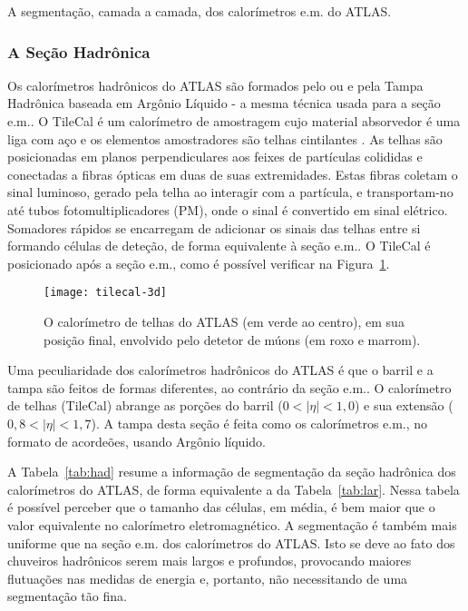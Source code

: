 \begin{table}
\caption{A segmentação, camada a camada, dos calo\-rí\-metros e.m. do ATLAS.}
\label{tab:lar}
\begin{center}

\end{center}
\end{table}

\subsubsection{A Seção Hadrônica}

Os calorímetros hadrônicos do ATLAS são formados pelo  ou  e pela Tampa Hadrônica baseada em Argônio Líquido
- a mesma técnica usada para a seção e.m.. O TileCal é um calorímetro de
amostragem cujo material absorvedor é uma liga com aço e os elementos
amostradores são telhas cintilantes \cite{tilecal}. As telhas são posicionadas
em planos perpendiculares aos feixes de partículas colididas e conectadas a
fibras ópticas em duas de suas extremidades. Estas fibras coletam o sinal
luminoso, gerado pela telha ao interagir com a partícula, e transportam-no até
tubos fotomultiplicadores (PM), onde o sinal
é convertido em sinal elétrico. Somadores rápidos \cite{seixas:adder} se
encarregam de adicionar os sinais das telhas entre si formando células de
deteção, de forma equivalente à seção e.m.. O TileCal é posicionado após a
seção e.m., como é possível verificar na Figura~\ref{fig:tile-pos}.

\begin{figure}
\begin{center}
\texttt{[image: tilecal-3d]}
\end{center}
\caption{O calorímetro de telhas do ATLAS (em verde ao centro), em sua posição
final, envolvido pelo detetor de múons (em roxo e marrom).}
\label{fig:tile-pos}
\end{figure}

Uma peculiaridade dos calorímetros hadrônicos do ATLAS é que o barril e a
tampa são feitos de formas diferentes, ao contrário da seção e.m.. O
calorímetro de telhas (TileCal) abrange as porções do barril ($0<|\eta|<1,0$)
e sua extensão ($0,8<|\eta|<1,7$). A tampa desta seção é feita como os
calorímetros e.m., no formato de acordeões, usando Argônio líquido.

A Tabela~\ref{tab:had} resume a informação de segmentação da seção hadrônica
dos calorímetros do ATLAS, de forma equivalente a da Tabela~\ref{tab:lar}.
Nessa tabela é possível perceber que o tamanho das células, em média, é bem
maior que o valor equivalente no calorímetro eletromagnético. A segmentação
é também mais uniforme que na seção e.m. dos calorímetros do ATLAS. Isto se
deve ao fato dos chuveiros hadrônicos serem mais largos e profundos,
provocando maiores flutuações nas medidas de energia e, portanto, não
necessitando de uma segmentação tão fina.

